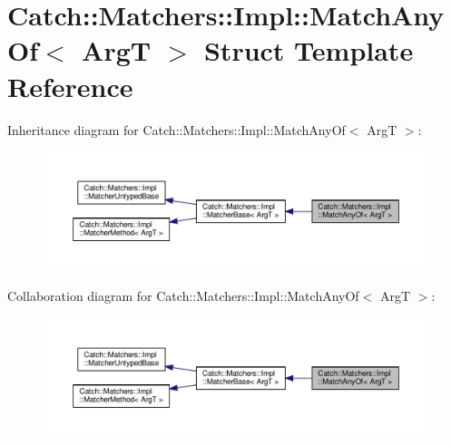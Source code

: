 \hypertarget{structCatch_1_1Matchers_1_1Impl_1_1MatchAnyOf}{}\section{Catch\+::Matchers\+::Impl\+::Match\+Any\+Of$<$ ArgT $>$ Struct Template Reference}
\label{structCatch_1_1Matchers_1_1Impl_1_1MatchAnyOf}


Inheritance diagram for Catch\+::Matchers\+::Impl\+::Match\+Any\+Of$<$ ArgT $>$\+:
\nopagebreak
\begin{figure}[H]
\begin{center}
\leavevmode
\includegraphics[width=350pt]{structCatch_1_1Matchers_1_1Impl_1_1MatchAnyOf__inherit__graph}
\end{center}
\end{figure}


Collaboration diagram for Catch\+::Matchers\+::Impl\+::Match\+Any\+Of$<$ ArgT $>$\+:
\nopagebreak
\begin{figure}[H]
\begin{center}
\leavevmode
\includegraphics[width=350pt]{structCatch_1_1Matchers_1_1Impl_1_1MatchAnyOf__coll__graph}
\end{center}
\end{figure}
